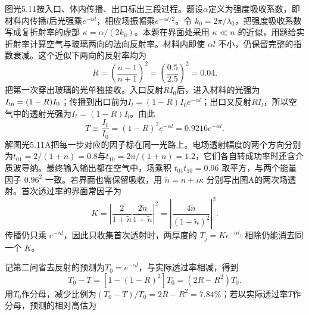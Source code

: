\documentclass[UTF8,fontset=fandol,a4paper,11pt]{ctexart}
\newcommand{\figcaption}[1]{\par\vspace{2pt}{\small\color{muted}#1}\par}
\begin{document}
图光5.11按入口、体内传播、出口标出三段过程。题设$\alpha$定义为强度吸收系数，即材料内传播$l$后光强乘$e^{-\alpha l}$，相应场振幅乘$e^{-\alpha l/2}$。令 $k_0=2\pi/\lambda_0$，把强度吸收系数写成复折射率的虚部 $\kappa=\alpha/(2k_0)$。本题在界面处采用 $\kappa\ll n$ 的近似，用题给实折射率计算空气与玻璃两向的法向反射率。材料内即使 $\alpha l$ 不小，仍保留完整的指数衰减。这个近似下两向的反射率均为
\[
R=\left(\frac{n-1}{n+1}\right)^2
=\left(\frac{0.5}{2.5}\right)^2=0.04.
\]
把第一次穿出玻璃的光单独接收。入口反射$RI_0$后，进入材料的光强为$I_{\rm in}=(1-R)I_0$；传播到出口前为$I_l=(1-R)I_0e^{-\alpha l}$；出口又反射$RI_l$，所以空气中的透射光强为$I_t=(1-R)I_l$。由此
\[
\boxed{T\equiv\frac{I_t}{I_0}=(1-R)^2e^{-\alpha l}
=0.9216e^{-\alpha l}}.
\]
解图光5.11A把每一步对应的因子标在同一光路上。电场透射幅度的两个方向分别为$t_{01}=2/(1+n)=0.8$与$t_{10}=2n/(1+n)=1.2$，它们各自转成功率时还含介质波导纳。最终输入输出都在空气中，场乘积 $t_{01}t_{10}=0.96$ 取平方，与两个能量因子 $0.96^2$ 一致。若界面也需保留吸收，用 $\widetilde n=n+i\kappa$ 分别写出图A的两次场透射。首次透过率的界面常因子为
\[
K=\left|\frac{2}{1+\widetilde n}\frac{2\widetilde n}{1+\widetilde n}\right|^2
 =\left|\frac{4\widetilde n}{(1+\widetilde n)^2}\right|^2 .
\]
传播仍只乘 $e^{-\alpha l}$，因此只收集首次透射时，两厚度的 $T_j=K e^{-\alpha l_j}$ 相除仍能消去同一个 $K$。
\begin{center}\begin{minipage}{.98\linewidth}\centering
{}
\figcaption{解图光5.11A\quad 首次透射依次经过入口、体吸收和出口}
\end{minipage}\end{center}
记第二问省去反射的预测为$T_0=e^{-\alpha l}$，与实际透过率相减，得到
\[
T_0-T=[1-(1-R)^2]T_0=(2R-R^2)T_0.
\]
用$T_0$作分母，减少比例为$(T_0-T)/T_0=2R-R^2=7.84\%$；若以实际透过率$T$作分母，预测的相对高估为
\end{document}
